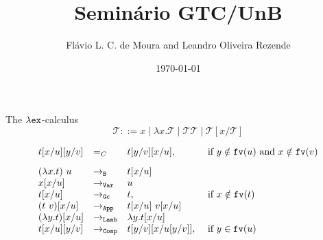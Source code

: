 \documentclass[10pt]{beamer}
\title{Seminário GTC/UnB}
\date{\today}
\author{Flávio L. C. de Moura and Leandro Oliveira Rezende}
\institute{Seminário GTC/UnB}
\newcommand{\term}{{\mathcal{T}}}
\newcommand{\fv}[1]{{\tt fv}(#1)}
\begin{document}
\maketitle


\begin{frame}[fragile]{The $\lambda{\tt ex}$-calculus}
  $$\term ::= x \mid \lambda x.\term \mid \term\term \mid \term[x/\term]$$

  $$\begin{array}{llll}
      t[x/u][y/v] & =_C & t[y/v][x/u], & \mbox{ if } y \notin\fv{u} \mbox{ and } x \notin \fv{v} \\[.3cm]
      (\lambda x. t)\ u & \to_{\tt B} & t[x/u] & \\      
      x[x/u] & \to_{\tt Var} & u & \\      
      t[x/u] & \to_{\tt Gc} & t, & \mbox{ if } x \notin\fv{t} \\      
      (t\ v)[x/u] & \to_{\tt App} & t[x/u]\ v[x/u] & \\
      (\lambda y. t)[x/u] & \to_{\tt Lamb} & \lambda y.t[x/u] & \\
      t[x/u][y/v] & \to_{\tt Comp} & t[y/v][x/u[y/v]], & \mbox{ if } y \in\fv{u} \\            
      \end{array}$$
\end{frame}
\end{document}
